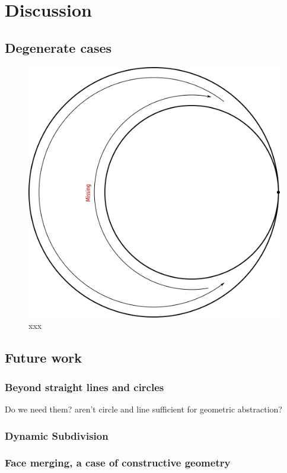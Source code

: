 \section{Discussion} \label{sec:discussion}

\subsection{Degenerate cases}

\begin{figure} %
    \centering
    \includegraphics[width=.5\textwidth]{figures/disc_specialCase1.png}
    \caption{xxx}
    \label{fig:disc_specialCase1}
\end{figure}


\subsection{Future work}


\subsubsection{Beyond straight lines and circles}

Do we need them? aren't circle and line sufficient for geometric abstraction?

\subsubsection{Dynamic Subdivision}


\subsubsection{Face merging, a case of constructive geometry}
